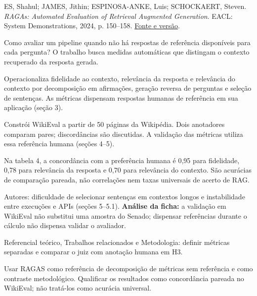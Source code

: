 {\small ES, Shahul; JAMES, Jithin; ESPINOSA-ANKE, Luis; SCHOCKAERT, Steven. \textit{RAGAs: Automated Evaluation of Retrieval Augmented Generation}. EACL: System Demonstrations, 2024, p. 150--158. \href{https://aclanthology.org/2024.eacl-demo.16/}{Fonte e versão}.\par}

Como avaliar um pipeline quando não há respostas de referência disponíveis para cada pergunta? O trabalho busca medidas automáticas que distingam o contexto recuperado da resposta gerada.

Operacionaliza fidelidade ao contexto, relevância da resposta e relevância do contexto por decomposição em afirmações, geração reversa de perguntas e seleção de sentenças. As métricas dispensam respostas humanas de referência em sua aplicação (seção 3).

Constrói WikiEval a partir de 50 páginas da Wikipédia. Dois anotadores comparam pares; discordâncias são discutidas. A validação das métricas utiliza essa referência humana (seções 4--5).

Na tabela 4, a concordância com a preferência humana é 0,95 para fidelidade, 0,78 para relevância da resposta e 0,70 para relevância do contexto. São acurácias de comparação pareada, não correlações nem taxas universais de acerto de RAG.

\begin{itemize}
\end{itemize}

Autores: dificuldade de selecionar sentenças em contextos longos e instabilidade entre execuções e APIs (seções 5--5.1). \textbf{Análise da ficha:} a validação em WikiEval não substitui uma amostra do Senado; dispensar referências durante o cálculo não dispensa validar o avaliador.

Referencial teórico, Trabalhos relacionados e Metodologia: definir métricas separadas e comparar o juiz com anotação humana em H3.

Usar RAGAS como referência de decomposição de métricas sem referência e como contraste metodológico. Qualificar os resultados como concordância pareada no WikiEval; não tratá-los como acurácia universal.


